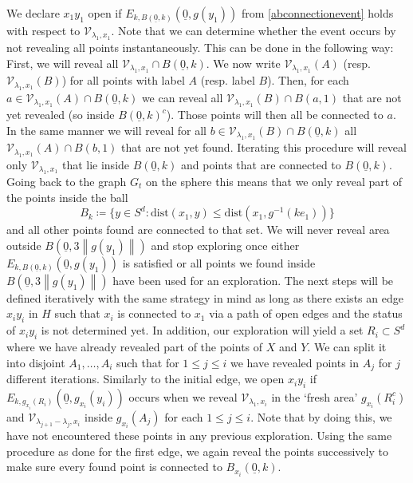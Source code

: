 \documentclass[11pt]{article}%
\newcommand{\norm}[1]{\ensuremath{\left\|#1\right\|}}
\newcommand{\dists}{{\mathrm{dist}}}
\newcommand{\typ}{\underline{0}}
\begin{document}
We declare $ x_1 y_1 $ open  if $ E_{k,B(\typ,k)}(\typ,g(y_1))  $ from \cref{abconnectionevent} holds with respect to  $ \mathcal{V}_{\lambda_1,x_1} $. Note that we can determine whether the event occurs by not revealing all points instantaneously. This can be done in the following way: First, we will reveal all $ \mathcal{V}_{\lambda_1,x_1}\cap B(\typ,k)  $. We now write $ \mathcal{V}_{\lambda_1,x_1}(A) $ (resp. $ \mathcal{V}_{\lambda_1,x_1}(B) $) for all points with label $ A $ (resp. label $ B $). Then, for each $  a\in \mathcal{V}_{\lambda_1,x_1}(A)\cap B(\typ,k) $ we can reveal all $ \mathcal{V}_{\lambda_1,x_1}(B)\cap B(a,1) $ that are not yet revealed (so inside $ B(\typ,k)^c $). Those points will then all be connected to $ a $. In the same manner we will reveal for all $  b\in \mathcal{V}_{\lambda_1,x_1}(B)\cap B(\typ,k) $ all $ \mathcal{V}_{\lambda_1,x_1}(A)\cap B(b,1) $ that are not yet found. Iterating this procedure will reveal only $  \mathcal{V}_{\lambda_1,x_1} $ that lie inside $ B(\typ,k) $ and points that are connected to $ B(\typ,k) $. Going back to the graph $ G_t $ on the sphere this means that we only reveal part of the points inside the ball 
  \begin{equation*}
  	B_k\coloneqq\{y\in S^d:\dists(x_1,y)\leq \dists(x_1,g^{-1}(ke_1)) \}
  \end{equation*}
   and all other points found are connected to that set. We will never reveal area outside $B(\typ,3\norm{g(y_1)})$ and stop exploring once either $ E_{k,B(\typ,k)}(\typ,g(y_1))   $ is satisfied or all points we found inside $B(\typ,3\norm{g(y_1)})$ have been used for an exploration. The next steps will be defined iteratively with the same strategy in mind as long as there exists an edge $ x_{i}y_i $ in $ H $ such that $ x_i $ is connected to $ x_1 $ via a path of open edges and the status of $ x_{i}y_i $ is not determined yet. In addition, our exploration will yield a set $ R_i\subset S^d $ where we have already revealed part of the points of $ X $ and $ Y $. We can split it into disjoint $ A_{1},\dots,A_i $ such that for $ 1\leq j\leq i $ we have revealed points in  $ A_j $ for $ j $ different iterations. Similarly to the initial edge, we open $ x_iy_i $ if $ E_{k,g_{x_i}(R_i)}(\typ,g_{x_i}(y_i)) $ occurs when we reveal $ \mathcal{V}_{\lambda_1,x_i} $ in the `fresh area' $ g_{x_i}(R^c_i) $ and $ \mathcal{V}_{\lambda_{j+1}-\lambda_{j},x_i} $ inside $ g_{x_i}(A_j) $ for each $ 1\leq j\leq i $. Note that by doing this, we have not encountered these points in any previous exploration. Using the same procedure as done for the first edge, we again reveal the points successively to make sure every found point is connected to $B_{x_i}(\typ,k)$.
\end{document}
